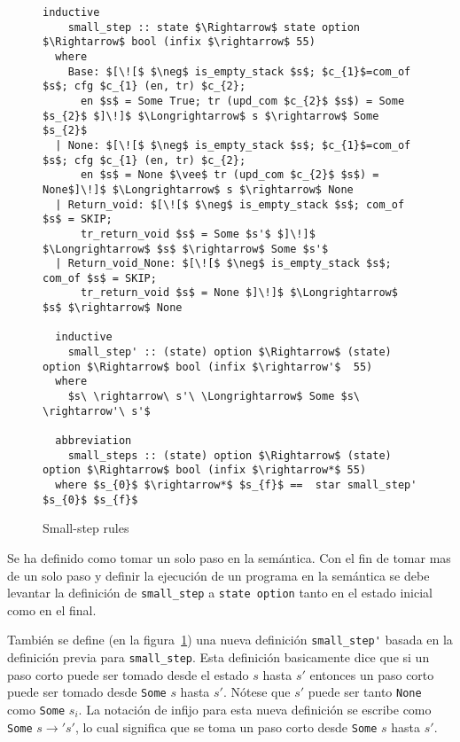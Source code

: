 \begin{figure}
  \begin{lstlisting}[frame=single, mathescape=true]
  inductive
    small_step :: state $\Rightarrow$ state option $\Rightarrow$ bool (infix $\rightarrow$ 55)
  where
    Base: $[\![$ $\neg$ is_empty_stack $s$; $c_{1}$=com_of $s$; cfg $c_{1} (en, tr) $c_{2};
      en $s$ = Some True; tr (upd_com $c_{2}$ $s$) = Some $s_{2}$ $]\!]$ $\Longrightarrow$ s $\rightarrow$ Some $s_{2}$
  | None: $[\![$ $\neg$ is_empty_stack $s$; $c_{1}$=com_of $s$; cfg $c_{1} (en, tr) $c_{2};
      en $s$ = None $\vee$ tr (upd_com $c_{2}$ $s$) = None$]\!]$ $\Longrightarrow$ s $\rightarrow$ None
  | Return_void: $[\![$ $\neg$ is_empty_stack $s$; com_of $s$ = SKIP;
      tr_return_void $s$ = Some $s'$ $]\!]$ $\Longrightarrow$ $s$ $\rightarrow$ Some $s'$
  | Return_void_None: $[\![$ $\neg$ is_empty_stack $s$; com_of $s$ = SKIP;
      tr_return_void $s$ = None $]\!]$ $\Longrightarrow$ $s$ $\rightarrow$ None

  inductive
    small_step' :: (state) option $\Rightarrow$ (state) option $\Rightarrow$ bool (infix $\rightarrow'$  55)
  where
    $s\ \rightarrow\ s'\ \Longrightarrow$ Some $s\ \rightarrow'\ s'$

  abbreviation
    small_steps :: (state) option $\Rightarrow$ (state) option $\Rightarrow$ bool (infix $\rightarrow*$ 55)
  where $s_{0}$ $\rightarrow*$ $s_{f}$ ==  star small_step' $s_{0}$ $s_{f}$
  \end{lstlisting}

  \caption{Small-step rules}
  \label{fig:small_step_rules}
\end{figure}

Se ha definido como tomar un solo paso en la semántica.
Con el fin de tomar mas de un solo paso y definir la ejecución de un programa en la semántica se debe levantar la definición de \verb|small_step| a \verb|state option| tanto en el estado inicial como en el final.

También se define (en la figura~\ref{fig:small_step_rules}) una nueva definición \verb|small_step'| basada en la definición previa para \verb|small_step|.
Esta definición basicamente dice que si un paso corto puede ser tomado desde el estado $s$ hasta $s'$ entonces un paso corto puede ser tomado desde \verb|Some| $s$ hasta $s'$.
Nótese que $s'$ puede ser tanto \verb|None| como \verb|Some| $s_{i}$.
La notación de infijo para esta nueva definición se escribe como \verb|Some| $s \rightarrow' s'$, lo cual significa que se toma un paso corto desde \verb|Some| $s$ hasta $s'$.

